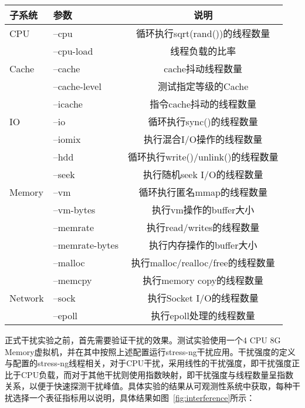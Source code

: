 \begin{table}[H]
    \centering
    \footnotesize%
    \setlength{\tabcolsep}{20pt}%
    \renewcommand{\arraystretch}{1.25}%
    \label{tab:arg_list}
    \begin{tabular}{llc}
        \hline
        子系统 & 参数 & 说明\\
        \hline
        CPU	    & --cpu & 循环执行sqrt(rand())的线程数量\\
	            & --cpu-load & 线程负载的比率\\
        Cache	& --cache & cache抖动线程数量\\
	            & --cache-level	&测试指定等级的Cache\\
	            & --icache	&指令cache抖动的线程数量\\
        IO	    & --io	&循环执行sync()的线程数量\\
	            & --iomix	&执行混合I/O操作的线程数量\\
	            & --hdd	&循环执行write()/unlink()的线程数量\\
	            & --seek	&执行随机seek I/O的线程数量\\
        Memory	& --vm	&循环执行匿名mmap的线程数量\\
	            & --vm-bytes	&执行vm操作的buffer大小\\
	            & --memrate	&执行read/writes的线程数量\\
	            & --memrate-bytes	&执行内存操作的buffer大小\\
	            & --malloc	&执行malloc/realloc/free的线程数量\\
	            & --memcpy	&执行memory copy的线程数量\\
        Network	& --sock	&执行Socket I/O的线程数量\\
	            & --epoll	&执行epoll处理的线程数量\\
        \hline
    \end{tabular}
\end{table}

正式干扰实验之前，首先需要验证干扰的效果。测试实验使用一个4 CPU 8G Memory虚拟机，并在其中按照上述配置运行stress-ng干扰应用。干扰强度的定义与配置的stress-ng线程相关，对于CPU干扰，采用线性的干扰强度，即干扰强度正比于CPU负载，而对于其他干扰则使用指数映射，即干扰强度与线程数量呈指数关系，以便于快速探测干扰峰值。具体实验的结果从可观测性系统中获取，每种干扰选择一个表征指标用以说明，具体结果如图~\ref{fig:interference}所示：

